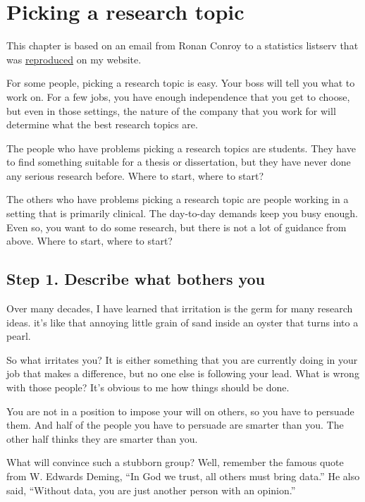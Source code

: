 \documentclass[
  letterpaper,
  DIV=11,
  numbers=noendperiod]{scrreprt}
\begin{document}

\chapter{Picking a research topic}\label{picking-a-research-topic}

This chapter is based on an email from Ronan Conroy to a statistics
listserv that was
\href{http://new.pmean.com/steps-in-developing-research-ideas/}{reproduced}
on my website.

For some people, picking a research topic is easy. Your boss will tell
you what to work on. For a few jobs, you have enough independence that
you get to choose, but even in those settings, the nature of the company
that you work for will determine what the best research topics are.

The people who have problems picking a research topics are students.
They have to find something suitable for a thesis or dissertation, but
they have never done any serious research before. Where to start, where
to start?

The others who have problems picking a research topic are people working
in a setting that is primarily clinical. The day-to-day demands keep you
busy enough. Even so, you want to do some research, but there is not a
lot of guidance from above. Where to start, where to start?

\section{Step 1. Describe what bothers
you}\label{step-1.-describe-what-bothers-you}

Over many decades, I have learned that irritation is the germ for many
research ideas. it's like that annoying little grain of sand inside an
oyster that turns into a pearl.

So what irritates you? It is either something that you are currently
doing in your job that makes a difference, but no one else is following
your lead. What is wrong with those people? It's obvious to me how
things should be done.

You are not in a position to impose your will on others, so you have to
persuade them. And half of the people you have to persuade are smarter
than you. The other half thinks they are smarter than you.

What will convince such a stubborn group? Well, remember the famous
quote from W. Edwards Deming, ``In God we trust, all others must bring
data.'' He also said, ``Without data, you are just another person with
an opinion.''
\end{document}
